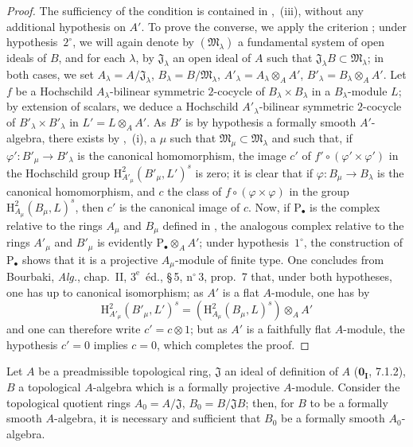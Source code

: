 \begin{proof}
The sufficiency of the condition is contained in ,~(iii), without any additional hypothesis on $A'$.
To prove the converse, we apply the criterion ;
under hypothesis~$2^\circ$, we will again denote by $(\mathfrak{M}_\lambda)$ a fundamental system of open ideals of $B$, and for each $\lambda$, by $\mathfrak{J}_\lambda$ an open ideal of $A$ such that $\mathfrak{J}_\lambda B\subset\mathfrak{M}_\lambda$;
in both cases, we set $A_\lambda=A/\mathfrak{J}_\lambda$, $B_\lambda=B/\mathfrak{M}_\lambda$, $A'_\lambda=A_\lambda\otimes_A A'$, $B'_\lambda=B_\lambda\otimes_A A'$.
Let $f$ be a Hochschild $A_\lambda$-bilinear symmetric $2$-cocycle of $B_\lambda\times B_\lambda$ in a $B_\lambda$-module $L$;
by extension of scalars, we deduce a Hochschild $A'_\lambda$-bilinear symmetric $2$-cocycle of $B'_\lambda\times B'_\lambda$ in $L'=L\otimes_A A'$.
As $B'$ is by hypothesis a formally smooth $A'$-algebra, there exists by ,~(i), a $\mu$ such that $\mathfrak{M}_\mu\subset\mathfrak{M}_\lambda$ and such that, if $\varphi':B'_\mu\to B'_\lambda$ is the canonical homomorphism, the image $c'$ of $f'\circ(\varphi'\times\varphi')$ in the Hochschild group $\mathrm{H}^2_{A'_\mu}(B'_\mu,L')^s$ is zero;
it is clear that if $\varphi:B_\mu\to B_\lambda$ is the canonical homomorphism, and $c$ the class of $f\circ(\varphi\times\varphi)$ in the group $\mathrm{H}^2_{A_\mu}(B_\mu,L)^s$, then $c'$ is the canonical image of $c$.
Now, if $\mathrm{P}_\bullet$ is the complex relative to the rings $A_\mu$ and $B_\mu$ defined in , the analogous complex relative to the rings $A'_\mu$ and $B'_\mu$ is evidently $\mathrm{P}_\bullet\otimes_A A'$;
under hypothesis~$1^\circ$, the construction of $\mathrm{P}_\bullet$ shows that it is a projective $A_\mu$-module of finite type.
One concludes from Bourbaki, \emph{Alg.}, chap.~II, $3^{\text{e}}$~\'{e}d., \S\,5, n$^\circ$\,3, prop.~7 that, under both hypotheses, one has up to canonical isomorphism;
as $A'$ is a flat $A$-module, one has by 
\[
  \mathrm{H}^2_{A'_\mu}(B'_\mu,L')^s = (\mathrm{H}^2_{A_\mu}(B_\mu,L)^s)\otimes_A A'
\]
and one can therefore write $c'=c\otimes 1$;
but as $A'$ is a faithfully flat $A$-module, the hypothesis $c'=0$ implies $c=0$, which completes the proof.
\end{proof}

\begin{proposition}[19.4.7]
\label{0.19.4.7}
Let $A$ be a preadmissible topological ring, $\mathfrak{J}$ an ideal of definition of $A$ ($\mathbf{0_I}$, 7.1.2), $B$ a topological $A$-algebra which is a formally projective $A$-module.
Consider the topological quotient rings $A_0=A/\mathfrak{J}$, $B_0=B/\mathfrak{J}B$;
then, for $B$ to be a formally smooth $A$-algebra, it is necessary and sufficient that $B_0$ be a formally smooth $A_0$-algebra.
\end{proposition}

